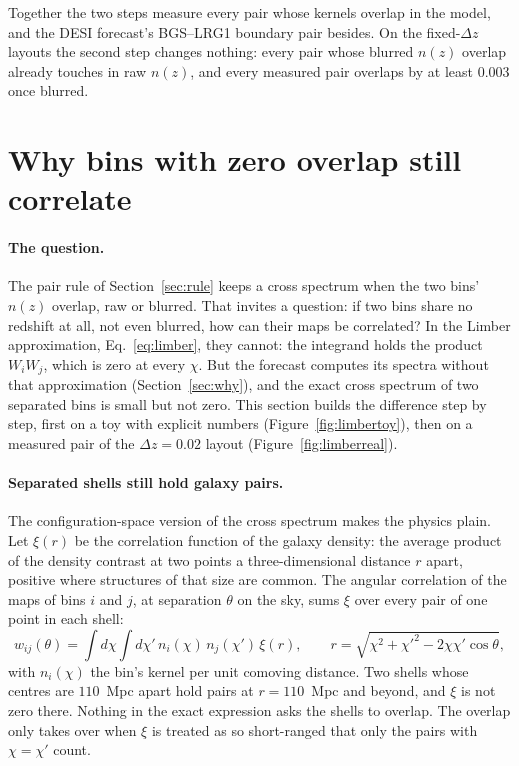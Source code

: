 \documentclass[11pt]{article}
\begin{document}
Together the two steps measure every pair whose kernels overlap in the
model, and the DESI forecast's BGS--LRG1 boundary pair besides.  On the
fixed-$\Delta z$ layouts the second step changes nothing: every pair
whose blurred $n(z)$ overlap already touches in raw $n(z)$, and every
measured pair overlaps by at least $0.003$ once blurred.

\section{Why bins with zero overlap still correlate}
\label{sec:limber}

\paragraph{The question.}
The pair rule of Section~\ref{sec:rule} keeps a cross spectrum when
the two bins' $n(z)$ overlap, raw or blurred.  That invites a
question: if two bins share no redshift at all, not even blurred,
how can their maps be correlated?  In the Limber approximation,
Eq.~\eqref{eq:limber}, they cannot: the integrand holds the product
$W_i W_j$, which is zero at every $\chi$.  But the forecast computes
its spectra without that approximation (Section~\ref{sec:why}), and
the exact cross spectrum of two separated bins is small but not
zero.  This section builds the difference step by step, first on a
toy with explicit numbers (Figure~\ref{fig:limbertoy}), then on a
measured pair of the $\Delta z = 0.02$ layout
(Figure~\ref{fig:limberreal}).

\paragraph{Separated shells still hold galaxy pairs.}
The configuration-space version of the cross spectrum makes the
physics plain.  Let $\xi(r)$ be the correlation function of the
galaxy density: the average product of the density contrast at two
points a three-dimensional distance $r$ apart, positive where
structures of that size are common.  The angular correlation of the
maps of bins $i$ and $j$, at separation $\theta$ on the sky, sums
$\xi$ over every pair of one point in each shell:
\begin{equation}
  w_{ij}(\theta) = \int d\chi \int d\chi'\,
  n_i(\chi)\, n_j(\chi')\, \xi(r),
  \qquad
  r = \sqrt{\chi^2 + \chi'^2 - 2\chi\chi' \cos\theta},
  \label{eq:wtheta}
\end{equation}
with $n_i(\chi)$ the bin's kernel per unit comoving distance.  Two
shells whose centres are $110$~Mpc apart hold pairs at
$r = 110$~Mpc and beyond, and $\xi$ is not zero there.  Nothing in
the exact expression asks the shells to overlap.  The overlap only
takes over when $\xi$ is treated as so short-ranged that only the
pairs with $\chi = \chi'$ count.
\end{document}
